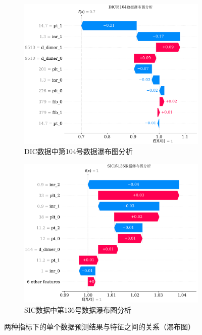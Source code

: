 \documentclass[12pt, a4paper, oneside]{ctexart}
\numberwithin{equation}{section}  %
\begin{document}
\begin{figure}[H]
   \begin{subfigure}[b]{1\textwidth}
       \includegraphics[scale=0.7]{SHAP/单个数据_shap_dic_waterfall}
       \caption{DIC数据中第104号数据瀑布图分析}
   \end{subfigure}

   \bigskip
   \begin{subfigure}[b]{1\textwidth}
       \includegraphics[scale=0.7]{SHAP/单个数据_shap_sic_waterfall}
       \caption{SIC数据中第136号数据瀑布图分析}
   \end{subfigure}
   \caption{两种指标下的单个数据预测结果与特征之间的关系（瀑布图）}
   \label{fig-shap-waterfall}
\end{figure}
\end{document}
